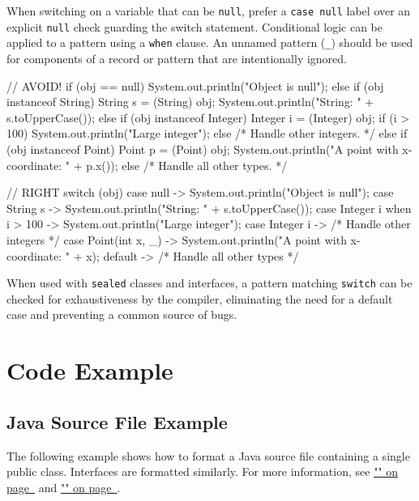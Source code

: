 \documentclass{article}
\newenvironment{note}[1]
  {\begin{notes}\item #1}{\end{notes}}
\begin{document}
When switching on a variable that can be \texttt{null}, prefer a \texttt{case null} label over an
explicit \texttt{null} check guarding the switch statement. Conditional logic can be applied to a
pattern using a \texttt{when} clause. An unnamed pattern (\texttt{\_}) should be used for components
of a record or pattern that are intentionally ignored.

\begin{snippet}
// AVOID!
if (obj == null) {
    System.out.println("Object is null");
} else if (obj instanceof String) {
    String s = (String) obj;
    System.out.println("String: " + s.toUpperCase());
} else if (obj instanceof Integer) {
    Integer i = (Integer) obj;
    if (i > 100) {
        System.out.println("Large integer");
    } else {
        /* Handle other integers. */
    }
} else if (obj instanceof Point) {
    Point p = (Point) obj;
    System.out.println("A point with x-coordinate: " + p.x());
} else {
    /* Handle all other types. */
}

// RIGHT
switch (obj) {
    case null -> System.out.println("Object is null");
    case String s -> System.out.println("String: " + s.toUpperCase());
    case Integer i when i > 100 -> System.out.println("Large integer");
    case Integer i -> { /* Handle other integers */ }
    case Point(int x, _) -> System.out.println("A point with x-coordinate: " + x);
    default -> { /* Handle all other types */ }
}
\end{snippet}

\begin{note}
When used with \texttt{sealed} classes and interfaces, a pattern matching \texttt{switch} can be
checked for exhaustiveness by the compiler, eliminating the need for a default case and preventing
a common source of bugs.
\end{note}

\section{Code Example}

\subsection{Java Source File Example}
\label{codeexample}

The following example shows how to format a Java source file containing a single public class.
Interfaces are formatted similarly. For more information, see
\hyperref[classesinterfaces]{"" on page~\pageref*{classesinterfaces}}
and \hyperref[doccomments]{"" on page~\pageref*{doccomments}}.
\end{document}
